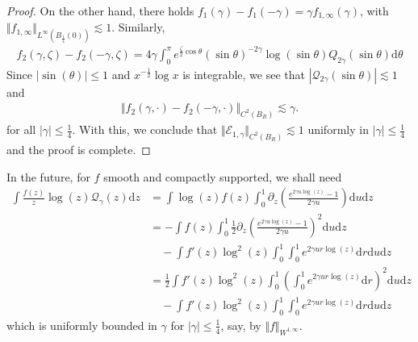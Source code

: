 \documentclass[11pt,reqno]{amsproc}
\theoremstyle{definition}
\numberwithin{equation}{section}
\newcommand{\E}{{\mathcal E}}
\newcommand{\Q}{{\mathcal{Q}}}
\renewcommand{\d}{\mathrm{d}}
\begin{document}
\begin{proof}
On the other hand,  there holds $f_1(\gamma) - f_1(-\gamma) = \gamma f_{1,\infty}(\gamma)$, with $\Vert f_{1,\infty}\Vert_{L^\infty(B_\frac14(0))}\lesssim 1$. Similarly,
\begin{align*}
f_2(\gamma,\zeta) - f_2(-\gamma,\zeta) = 4\gamma\int_0^\pi e^{\frac{\zeta}{2}\cos\theta} (\sin\theta)^{-2\gamma}  \log(\sin\theta) Q_{2\gamma}(\sin\theta) \d \theta
\end{align*}
Since $|\sin(\theta)|\leq 1$ and $x^{-\frac12}\log x$ is integrable, we see that $|\Q_{2\gamma}(\sin\theta)|\lesssim1$ and
\begin{align*}
\Vert f_2(\gamma,\cdot) - f_2(-\gamma,\cdot)\Vert_{C^2(B_R)}\lesssim \gamma.
\end{align*}
for all $|\gamma|\leq \tfrac14$. With this, we conclude that $\Vert \E_{1,\gamma}\Vert_{C^2(B_R)}\lesssim 1$ uniformly in $|\gamma|\leq\tfrac14$ and the proof is complete.
\end{proof}

In the future, for $f$ smooth and compactly supported, we shall need
\begin{align*}
\int \frac{f(z)}{z}\log(z) \mathcal{Q}_\gamma(z) \d z &= \int \log(z) f(z) \int_0^1 \partial_z \left( \frac{e^{2\gamma u \log(z)} - 1}{2\gamma u} \right) \d u \d z \\
&= - \int f(z) \int_0^1 \frac12\partial_z \left(  \frac{e^{2\gamma u \log(z)} -1 }{2\gamma u} \right)^2 \d u \d z \\
&\quad - \int f'(z) \log^2(z) \int_0^1 \int_0^1 e^{2\gamma u r \log(z)} \d r \d u \d z \\
&= \frac12\int f'(z) \log^2(z)\int_0^1 \left( \int_0^1 e^{2\gamma u r \log(z)} \d r \right)^2 \d u \d z
\\
&\quad - \int f'(z) \log^2(z) \int_0^1 \int_0^1 e^{2\gamma u r \log(z)} \d r \d u \d z
\end{align*}
which is uniformly bounded in $\gamma$ for $|\gamma|\leq \frac14$, say, by $\Vert f \Vert_{W^{1,\infty}}$.
\end{document}
